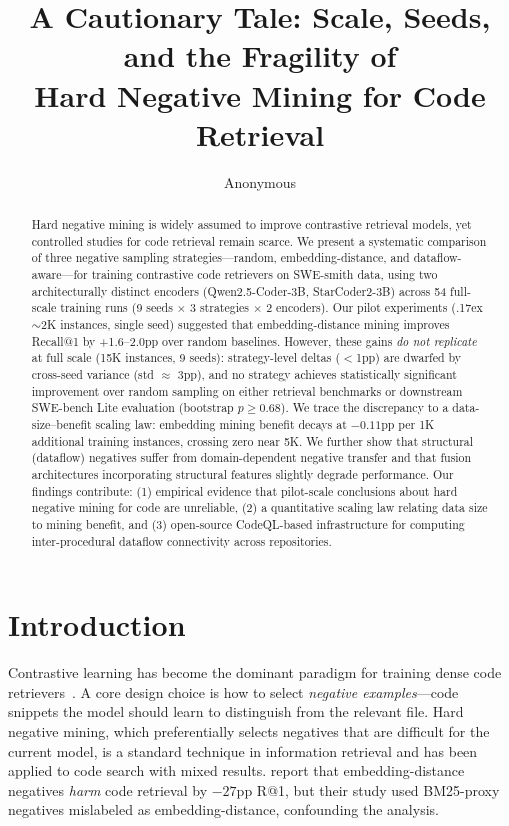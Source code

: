 \documentclass[11pt,a4paper]{article}
\title{A Cautionary Tale: Scale, Seeds, and the Fragility of\\Hard Negative Mining for Code Retrieval}
\author{Anonymous}
\begin{document}
\maketitle

\begin{abstract}
Hard negative mining is widely assumed to improve contrastive retrieval models, yet controlled studies for code retrieval remain scarce.
We present a systematic comparison of three negative sampling strategies---random, embedding-distance, and dataflow-aware---for training contrastive code retrievers on SWE-smith data, using two architecturally distinct encoders (Qwen2.5-Coder-3B, StarCoder2-3B) across 54 full-scale training runs (9 seeds $\times$ 3 strategies $\times$ 2 encoders).
Our pilot experiments ({\raise.17ex\hbox{$\scriptstyle\sim$}}2K instances, single seed) suggested that embedding-distance mining improves Recall@1 by +1.6--2.0pp over random baselines.
However, these gains \emph{do not replicate} at full scale (15K instances, 9 seeds): strategy-level deltas ($<$1pp) are dwarfed by cross-seed variance (std $\approx$ 3pp), and no strategy achieves statistically significant improvement over random sampling on either retrieval benchmarks or downstream SWE-bench Lite evaluation (bootstrap $p \geq 0.68$).
We trace the discrepancy to a data-size--benefit scaling law: embedding mining benefit decays at $-0.11$pp per 1K additional training instances, crossing zero near 5K.
We further show that structural (dataflow) negatives suffer from domain-dependent negative transfer and that fusion architectures incorporating structural features slightly degrade performance.
Our findings contribute: (1) empirical evidence that pilot-scale conclusions about hard negative mining for code are unreliable, (2) a quantitative scaling law relating data size to mining benefit, and (3) open-source CodeQL-based infrastructure for computing inter-procedural dataflow connectivity across repositories.
\end{abstract}

\section{Introduction}

Contrastive learning has become the dominant paradigm for training dense code retrievers~\cite{li2023swerank,yang2024swefixer}.
A core design choice is how to select \emph{negative examples}---code snippets the model should learn to distinguish from the relevant file.
Hard negative mining, which preferentially selects negatives that are difficult for the current model, is a standard technique in information retrieval and has been applied to code search with mixed results.
\citet{gao2024cocohanere} report that embedding-distance negatives \emph{harm} code retrieval by $-27$pp R@1, but their study used BM25-proxy negatives mislabeled as embedding-distance, confounding the analysis.
\end{document}
